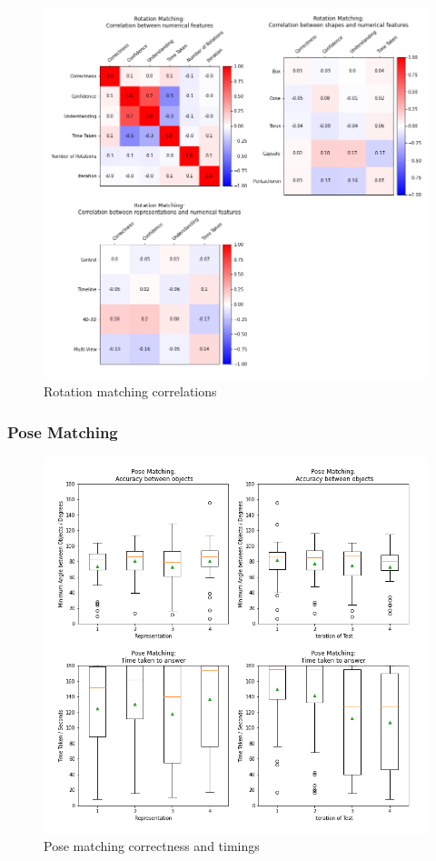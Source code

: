 \documentclass{l4proj}
\begin{document}
\begin{figure}[H]
  \includegraphics[width=\textwidth]{images/results/rotation_matching_correlations.png}
  \caption{Rotation matching correlations}
  \label{fig:shape_corr}
\end{figure}

\subsubsection{Pose Matching}

\begin{figure}[H]
  \includegraphics[width=\textwidth]{images/results/pose_matching_stats.png}
  \caption{Pose matching correctness and timings}
  \label{fig:shape_stats}
\end{figure}
\end{document}
